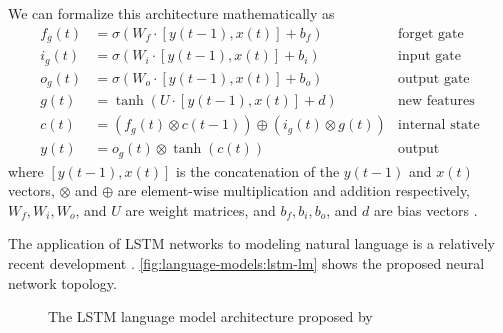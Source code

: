 We can formalize this architecture mathematically as
\begin{align}
    f_g(t) & = \sigma\left(W_f \cdot [y(t-1), x(t)] + b_f\right)                          & \text{forget gate}  \nonumber \\
    i_g(t) & = \sigma\left(W_i \cdot [y(t-1), x(t)] + b_i\right)                          & \text{input gate}   \nonumber \\
    o_g(t) & = \sigma\left(W_o \cdot [y(t-1), x(t)] + b_o\right)                          & \text{output gate}  \nonumber \\
    g(t)   & = \tanh \left(U   \cdot [y(t-1), x(t)] + d  \right)                          & \text{new features} \nonumber \\
    c(t)   & = \left(f_g(t) \otimes c(t-1)\right) \oplus \left(i_g(t) \otimes g(t)\right) & \text{internal state}         \\
    y(t)   & = o_g(t) \otimes \tanh\left(c(t)\right)                                      & \text{output}
\end{align}
where $[y(t-1), x(t)]$ is the concatenation of the $y(t-1)$ and $x(t)$ vectors, $\otimes$ and $\oplus$ are element-wise multiplication and addition respectively, $W_f, W_i, W_o$, and $U$ are weight matrices, and $b_f, b_i, b_o$, and $d$ are bias vectors \cite{jing_survey}.

The application of LSTM networks to modeling natural language is a relatively recent development \cite{Sundermeyer2012LSTMNN}.
\autoref{fig:language-models:lstm-lm} shows the proposed neural network topology.

\begin{figure}[h]
    \centering
    \caption{The LSTM language model architecture proposed by \cite{Sundermeyer2012LSTMNN}}\label{fig:language-models:lstm-lm}
\end{figure}

